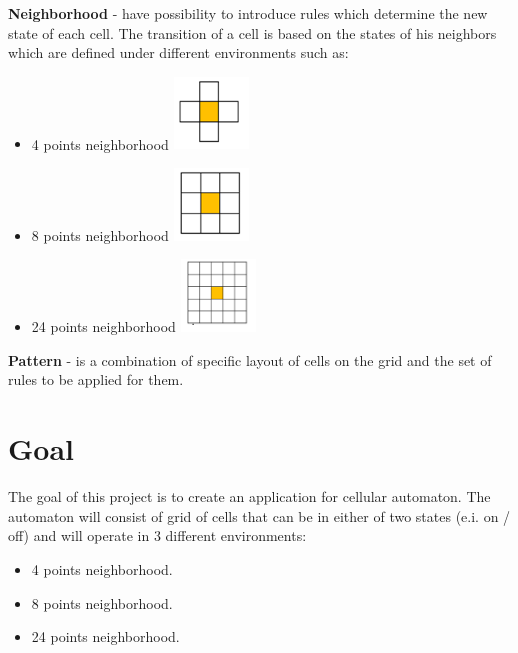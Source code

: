 \documentclass{article}
\begin{document}
\Large {\bf Neighborhood
} 
	-  have possibility to introduce rules which determine the new state of 
	each cell. The transition of a cell is based on the states of his neighbors which are
	defined under different environments such as:
	\begin{itemize}
	
	\item	
		4 points neighborhood \hspace{35pt} 
			 \includegraphics[width=20mm]{images/4_neigh.png} \\

	\item	
		8 points neighborhood \hspace{35pt}
			\includegraphics[width=20mm]{images/8_neigh.png} \\

	\item	
		24 points neighborhood \hspace{35pt}
			\includegraphics[width=20mm]{images/24_neigh.png} \\				
	\end{itemize}

\Large {\bf Pattern
} - is a combination of specific layout of cells on the grid and the set of rules to be applied for them.

\newpage

\section{Goal}

\hspace{15pt}The goal of this project is to create an application for cellular automaton. The automaton will consist of grid of cells that can be in either of two states
(e.i. on / off) and will operate in 3 different environments:
\begin{itemize}
	\item 4 points neighborhood.
	\item 8 points neighborhood.
	\item 24 points neighborhood.
\end{itemize}
\end{document}
